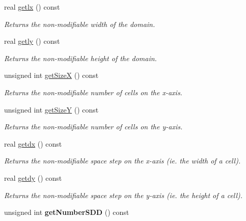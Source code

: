 \begin{DoxyCompactItemize}
real \mbox{\hyperlink{classDomain_a510afad91fe81eb2ccef203a980f4223}{getlx}} () const
\begin{DoxyCompactList}\small\item\em Returns the non-\/modifiable width of the domain. \end{DoxyCompactList}\item 
real \mbox{\hyperlink{classDomain_ac9cedab179bb0611fc0e9fcfbcedb835}{getly}} () const
\begin{DoxyCompactList}\small\item\em Returns the non-\/modifiable height of the domain. \end{DoxyCompactList}\item 
unsigned int \mbox{\hyperlink{classDomain_a75f299e3871fe9cec01637b140429ef9}{get\+SizeX}} () const
\begin{DoxyCompactList}\small\item\em Returns the non-\/modifiable number of cells on the x-\/axis. \end{DoxyCompactList}\item 
unsigned int \mbox{\hyperlink{classDomain_a66692b4f23353c9b1fe884e583770cb3}{get\+SizeY}} () const
\begin{DoxyCompactList}\small\item\em Returns the non-\/modifiable number of cells on the y-\/axis. \end{DoxyCompactList}\item 
real \mbox{\hyperlink{classDomain_acdb586f6ef994a1621680ec9b946aeb4}{getdx}} () const
\begin{DoxyCompactList}\small\item\em Returns the non-\/modifiable space step on the x-\/axis (ie. the width of a cell). \end{DoxyCompactList}\item 
real \mbox{\hyperlink{classDomain_a5e62ab8a8b53f67cc3c30b6066b10aac}{getdy}} () const
\begin{DoxyCompactList}\small\item\em Returns the non-\/modifiable space step on the y-\/axis (ie. the height of a cell). \end{DoxyCompactList}\item 
\mbox{\label{classDomain_a978917d5bf263dd1345f1a41c9edf661}} 
unsigned int {\bfseries get\+Number\+S\+DD} () const
\item 
\mbox{\label{classDomain_a02cc51cc2e5d976810039e7118382cde}} 

\end{DoxyCompactItemize}
